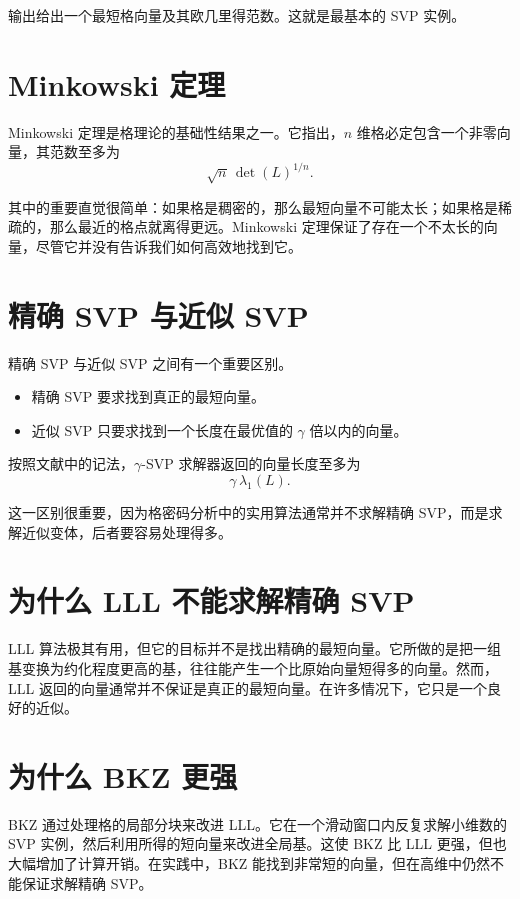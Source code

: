 输出给出一个最短格向量及其欧几里得范数。这就是最基本的 SVP 实例。

\section{Minkowski 定理}

Minkowski 定理是格理论的基础性结果之一。它指出，$n$ 维格必定包含一个非零向量，其范数至多为
\[
\sqrt{n}\,\det(L)^{1/n}.
\]

其中的重要直觉很简单：如果格是稠密的，那么最短向量不可能太长；如果格是稀疏的，那么最近的格点就离得更远。Minkowski 定理保证了存在一个不太长的向量，尽管它并没有告诉我们如何高效地找到它。

\section{精确 SVP 与近似 SVP}

精确 SVP 与近似 SVP 之间有一个重要区别。

\begin{itemize}
  \item 精确 SVP 要求找到真正的最短向量。
  \item 近似 SVP 只要求找到一个长度在最优值的 $\gamma$ 倍以内的向量。
\end{itemize}

按照文献中的记法，$\gamma$-SVP 求解器返回的向量长度至多为
\[
\gamma\,\lambda_1(L).
\]

这一区别很重要，因为格密码分析中的实用算法通常并不求解精确 SVP，而是求解近似变体，后者要容易处理得多。

\section{为什么 LLL 不能求解精确 SVP}

LLL 算法极其有用，但它的目标并不是找出精确的最短向量。它所做的是把一组基变换为约化程度更高的基，往往能产生一个比原始向量短得多的向量。然而，LLL 返回的向量通常并不保证是真正的最短向量。在许多情况下，它只是一个良好的近似。

\section{为什么 BKZ 更强}

BKZ 通过处理格的局部分块来改进 LLL。它在一个滑动窗口内反复求解小维数的 SVP 实例，然后利用所得的短向量来改进全局基。这使 BKZ 比 LLL 更强，但也大幅增加了计算开销。在实践中，BKZ 能找到非常短的向量，但在高维中仍然不能保证求解精确 SVP。

